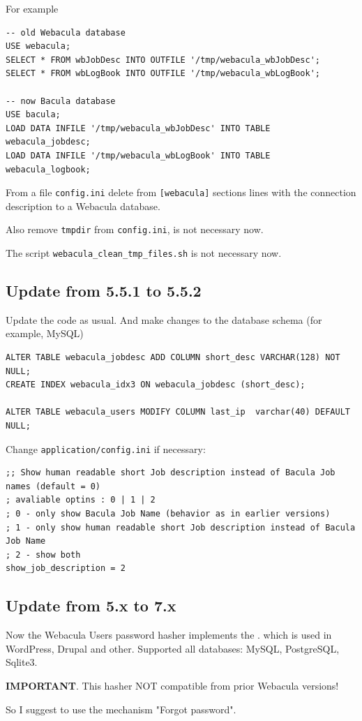 \documentclass[10pt]{article}
\begin{document}
For example

\begin{verbatim}
-- old Webacula database
USE webacula;
SELECT * FROM wbJobDesc INTO OUTFILE '/tmp/webacula_wbJobDesc';
SELECT * FROM wbLogBook INTO OUTFILE '/tmp/webacula_wbLogBook';

-- now Bacula database
USE bacula;
LOAD DATA INFILE '/tmp/webacula_wbJobDesc' INTO TABLE webacula_jobdesc;
LOAD DATA INFILE '/tmp/webacula_wbLogBook' INTO TABLE webacula_logbook;
\end{verbatim}

From a file \texttt{config.ini} delete from \texttt{[webacula]} sections lines with the connection
description to a Webacula database.

Also remove \texttt{tmpdir} from \texttt{config.ini}, is not necessary now.

The script \texttt{webacula\_clean\_tmp\_files.sh} is not necessary now.

\subsection{Update from 5.5.1 to 5.5.2}
\label{Update: from 5.5.1 to 5.5.2}

Update the code as usual.
And make changes to the database schema (for example, MySQL)

\begin{verbatim}
ALTER TABLE webacula_jobdesc ADD COLUMN short_desc VARCHAR(128) NOT NULL;
CREATE INDEX webacula_idx3 ON webacula_jobdesc (short_desc);

ALTER TABLE webacula_users MODIFY COLUMN last_ip  varchar(40) DEFAULT NULL;
\end{verbatim}

Change \texttt{application/config.ini} if necessary:

\begin{verbatim}
;; Show human readable short Job description instead of Bacula Job names (default = 0)
; avaliable optins : 0 | 1 | 2
; 0 - only show Bacula Job Name (behavior as in earlier versions)
; 1 - only show human readable short Job description instead of Bacula Job Name
; 2 - show both
show_job_description = 2
\end{verbatim}

\subsection{Update from 5.x to 7.x}
\label{Update: from 5.x to 7.x}

Now the Webacula Users password hasher implements the 
.
which is used in WordPress, Drupal and other.
Supported all databases: MySQL, PostgreSQL, Sqlite3.

\textbf{IMPORTANT}. This hasher NOT compatible from prior Webacula versions!

So I suggest to use the mechanism "Forgot password".
\end{document}
